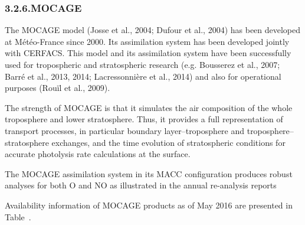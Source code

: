 \documentclass[9pt]{report}
\begin{document}
\subsubsection{3.2.6.\hspace*{0.5em}MOCAGE}\label{sec-mocage}%

\noindent{}The MOCAGE model (Josse et al., 2004; Dufour et al., 2004) has been developed at Météo-France since 2000. 
Its assimilation system has been developed jointly with CERFACS. 
This model and its assimilation system have been successfully used for tropospheric and stratospheric research (e.g. Bousserez et al., 2007; Barré et al., 2013, 2014; Lacressonnière et al., 2014) and also for operational purposes (Rouïl et al., 2009).%

The strength of MOCAGE is that it simulates the air composition of the whole troposphere and lower stratosphere. 
Thus, it provides a full representation of transport processes, in particular boundary layer–troposphere and troposphere–stratosphere exchanges, and the time evolution of stratospheric conditions for accurate photolysis rate calculations at the surface.%

The MOCAGE assimilation system in its MACC conﬁguration produces robust analyses for both O and NO as illustrated in the annual re-analysis reports %

Availability information of MOCAGE products as of May 2016 are presented in Table~.%
\end{document}
